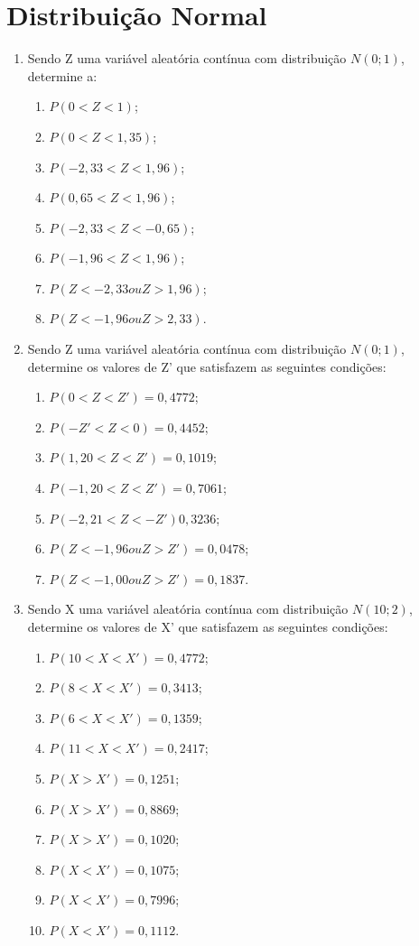 \chapter{Distribuição Normal}

\begin{enumerate}[resume]

\item Sendo Z uma variável aleatória contínua com distribuição $N(0 ; 1)$, determine a: 
	\begin{enumerate}
	\item $P(0 < Z < 1)$;
	\item $P(0 < Z < 1,35)$;
	\item $ P(-2,33 < Z < 1,96)$;
	\item $P(0,65 < Z < 1,96) $;
	\item $P(-2,33 < Z < -0,65)$;
	\item $ P(-1,96 < Z < 1,96)$;
	\item $P(Z < -2,33 ou Z > 1,96)$;
	\item $P(Z < -1,96 ou Z > 2,33)$.
	\end{enumerate}

\item Sendo Z uma variável aleatória contínua com distribuição $N(0 ; 1)$, determine os valores de Z' que satisfazem as seguintes condições: 
	\begin{enumerate}
	\item $P(0 < Z < Z')=0,4772$;
	\item $P(-Z' < Z < 0) = 0,4452$;
	\item $ P(1,20 < Z < Z') = 0,1019$;
	\item $P(-1,20 < Z < Z') = 0,7061$;
	\item $P(-2,21 < Z < -Z') 0,3236$;
	\item $ P(Z < -1,96 ou Z > Z') = 0,0478$;
	\item $P(Z < -1,00 ou Z > Z') = 0,1837$.
	\end{enumerate}
	
\item Sendo X uma variável aleatória contínua com distribuição $N(10 ; 2)$, determine os valores de X' que satisfazem as seguintes condições: 
	\begin{enumerate}
	\item $P(10 < X < X')=0,4772$;
	\item $P(8 < X < X') = 0,3413$;
	\item $P(6 < X < X') = 0,1359$;
	\item $P(11 < X < X') = 0,2417$;
	\item $P(X > X') = 0,1251$;
	\item $P(X > X') = 0,8869$;
	\item $P(X > X') = 0,1020$;
	\item $P(X < X') = 0,1075$;
	\item $P(X < X') = 0,7996$;	
	\item $P(X < X') = 0,1112$.
	\end{enumerate}


\end{enumerate}
